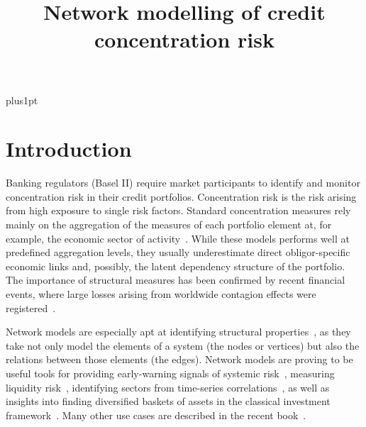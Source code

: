 \documentclass[12pt,beltcrest]{ociamthesis} %
\title{Network modelling
of credit concentration risk}
\begin{document}
\baselineskip=18pt plus1pt

\setcounter{secnumdepth}{3}
\setcounter{tocdepth}{3}


\maketitle                  %

\begin{romanpages}          %
\tableofcontents            %
\listoffigures              %
\end{romanpages}            %

\chapter{Introduction}



Banking regulators (Basel II) require market participants to identify and monitor concentration risk in their credit portfolios.
Concentration risk is the risk arising from high exposure to single risk factors.
Standard concentration measures rely mainly on the aggregation of the measures of each portfolio element at, for example, the economic sector of activity~\cite{lutkebohmert2008concentration}.
While these models performs well at predefined aggregation levels, they usually underestimate direct obligor-specific economic links and, possibly, the latent dependency structure of the portfolio.
The importance of structural measures has been confirmed by recent financial events, where large losses arising from worldwide contagion effects were registered~\cite{Kazi:2013vr}.
	
Network models are especially apt at identifying structural properties~\cite{newman2010networks}, as they take not only model the elements of a system (the nodes or vertices) but also the relations between those elements (the edges).
Network models are proving to be useful tools for providing early-warning signals of systemic risk~\cite{Squartini:2013ev}, measuring liquidity risk~\cite{Karas:2012tp}, identifying sectors from time-series correlations~\cite{Onnela:2004vz,Fenn:2009uf,Fenn:2011kp}, as well as insights into finding diversified baskets of assets in the classical investment framework~\cite{Pozzi:2013ci}.
Many other use cases are described in the recent book~\cite{Soramaki2016}.
\end{document}
